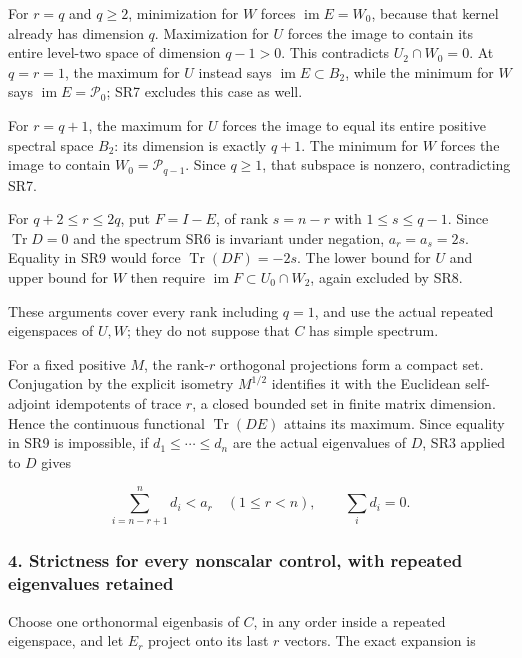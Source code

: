 For \(r=q\) and \(q\ge2\), minimization for \(W\) forces \(\operatorname{im}E=W_0\), because that kernel already has dimension \(q\). Maximization for \(U\) forces the image to contain its entire level-two space of dimension \(q-1>0\). This contradicts \(U_2\cap W_0=0\). At \(q=r=1\), the maximum for \(U\) instead says \(\operatorname{im}E\subset B_2\), while the minimum for \(W\) says \(\operatorname{im}E=\mathcal P_0\); SR7 excludes this case as well.

For \(r=q+1\), the maximum for \(U\) forces the image to equal its entire positive spectral space \(B_2\): its dimension is exactly \(q+1\). The minimum for \(W\) forces the image to contain \(W_0=\mathcal P_{q-1}\). Since \(q\ge1\), that subspace is nonzero, contradicting SR7.

For \(q+2\le r\le2q\), put \(F=I-E\), of rank \(s=n-r\) with \(1\le s\le q-1\). Since \(\operatorname{Tr}D=0\) and the spectrum SR6 is invariant under negation, \(a_r=a_s=2s\). Equality in SR9 would force \(\operatorname{Tr}(DF)=-2s\). The lower bound for \(U\) and upper bound for \(W\) then require \(\operatorname{im}F\subset U_0\cap W_2\), again excluded by SR8.

These arguments cover every rank including \(q=1\), and use the actual repeated eigenspaces of \(U,W\); they do not suppose that \(C\) has simple spectrum.

For a fixed positive \(M\), the rank-\(r\) orthogonal projections form a compact set. Conjugation by the explicit isometry \(M^{1/2}\) identifies it with the Euclidean self-adjoint idempotents of trace \(r\), a closed bounded set in finite matrix dimension. Hence the continuous functional \(\operatorname{Tr}(DE)\) attains its maximum. Since equality in SR9 is impossible, if \(d_1\le\cdots\le d_n\) are the actual eigenvalues of \(D\), SR3 applied to \(D\) gives

\[
\sum_{i=n-r+1}^{n}d_i<a_r\quad(1\le r<n),
\qquad \sum_i d_i=0.
\tag{SR10}
\]

\subsubsection{4. Strictness for every nonscalar control, with repeated eigenvalues retained}\label{endpoint-four_window_sharpness_review--strictness-for-every-nonscalar-control-with-repeated-eigenvalues-retained}

Choose one orthonormal eigenbasis of \(C\), in any order inside a repeated eigenspace, and let \(E_r\) project onto its last \(r\) vectors. The exact expansion is

